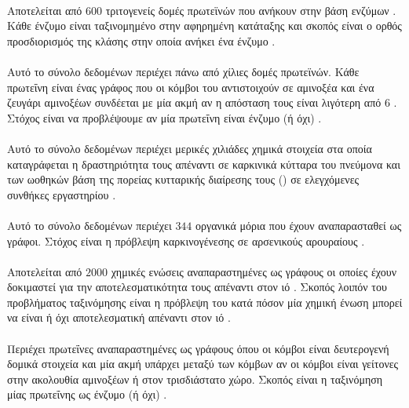 \paragraph*{} Αποτελείται από $600$ τριτογενείς δομές πρωτεϊνών που ανήκουν στην βάση ενζύμων .
Κάθε ένζυμο είναι ταξινομημένο στην αφηρημένη κατάταξης  και σκοπός είναι ο ορθός προσδιορισμός της κλάσης στην οποία ανήκει ένα ένζυμο \cite{Borgwardt2005}.

\paragraph*{} Αυτό το σύνολο δεδομένων περιέχει πάνω από χίλιες δομές πρωτεϊνών.
Κάθε πρωτεΐνη είναι ένας γράφος που οι κόμβοι του αντιστοιχούν σε αμινοξέα και ένα ζευγάρι αμινοξέων συνδέεται με μία ακμή αν η απόσταση τους είναι λιγότερη από 6 .
Στόχος είναι να προβλέψουμε αν μία πρωτεΐνη είναι ένζυμο (ή όχι) \cite{DobsonDoig03, shervashidze2011weisfeiler}.

\paragraph*{} Αυτό το σύνολο δεδομένων περιέχει μερικές χιλιάδες χημικά στοιχεία στα οποία καταγράφεται η δραστηριότητα τους απέναντι σε καρκινικά κύτταρα του πνεύμονα και των ωοθηκών βάση της πορείας κυτταρικής διαίρεσης τους () σε ελεγχόμενες συνθήκες εργαστηρίου \cite{Wale2008}.

\paragraph*{} Αυτό το σύνολο δεδομένων περιέχει $344$ οργανικά μόρια που έχουν αναπαρασταθεί ως γράφοι.
Στόχος είναι η πρόβλεψη καρκινογένεσης σε αρσενικούς αρουραίους \cite{Toivonen2003}.

\paragraph*{} Αποτελείται από $2000$ χημικές ενώσεις αναπαραστημένες ως γράφους οι οποίες έχουν δοκιμαστεί για την αποτελεσματικότητα τους απέναντι στον ιό . Σκοπός λοιπόν του προβλήματος ταξινόμησης είναι η πρόβλεψη του κατά πόσον μία χημική ένωση μπορεί να είναι ή όχι αποτελεσματική απέναντι στον ιό \cite{Riesen08}.

\paragraph*{} Περιέχει πρωτεΐνες αναπαραστημένες ως γράφους όπου οι κόμβοι είναι δευτερογενή δομικά στοιχεία και μία ακμή υπάρχει μεταξύ των κόμβων αν οι κόμβοι είναι γείτονες στην ακολουθία αμινοξέων ή στον τρισδιάστατο χώρο.
Σκοπός είναι η ταξινόμηση μίας πρωτεΐνης ως ένζυμο (ή όχι) \cite{borgwardt2005protein}.

